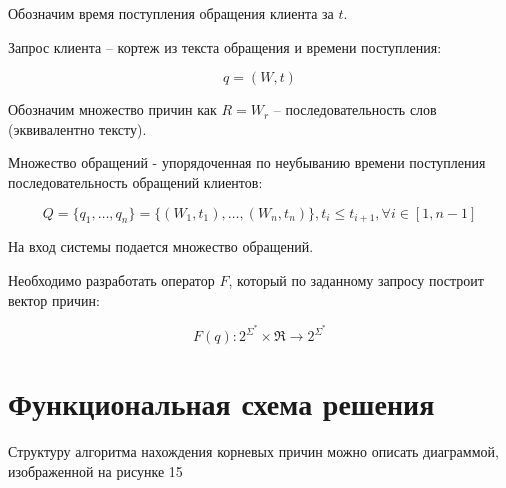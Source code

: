 \documentclass[a4paper,12pt,preview]{report} %
\begin{document}
	Обозначим время поступления обращения клиента за $t$.
	
	Запрос клиента -- кортеж из текста обращения и времени поступления:
	
	\begin{equation}
	q = (W, t)
	\end{equation}
	
	Обозначим множество причин как $R = W_r$ -- последовательность слов (эквивалентно тексту).
	
	Множество обращений - упорядоченная по неубыванию  времени поступления последовательность обращений клиентов:
	
	\begin{equation}
	Q = \{q_1, \dots, q_n\} = \{(W_1, t_1), \dots, (W_n, t_n)\}, t_i \leq t_{i+1}, \forall i \in [1, n-1]
	\end{equation} 
	
	На вход системы подается множество обращений.
	
	Необходимо разработать оператор $F$, который по заданному запросу построит вектор причин:
	
	\begin{equation}
	F(q) : 2^{\Sigma^\ast} \times \Re \rightarrow 2^{\Sigma^\ast}
	\end{equation}  
	
	\newpage
	
	\section{Функциональная схема решения}
	
	Структуру алгоритма нахождения корневых причин можно описать диаграммой, изображенной на рисунке 15
	
\end{document}
